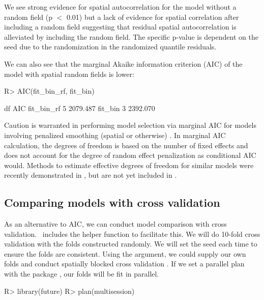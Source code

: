 \documentclass[article]{jss}\usepackage[]{graphicx}\usepackage[dvipsnames]{xcolor}
\newcommand{\fct}[1]{\code{#1()}}
\newcommand{\sdmTMB}{\pkg{sdmTMB}}
\begin{document}
We see strong evidence for spatial autocorrelation for the model without a random field (p $<$ 0.01) but a lack of evidence for spatial correlation after including a random field suggesting that residual spatial autocorrelation is alleviated by including the random field.
The specific p-value is dependent on the seed due to the randomization in the randomized quantile residuals.

We can also see that the marginal Akaike information criterion (AIC) \citep{akaike1974} of the model with spatial random fields is lower:

\begin{Schunk}
\begin{Sinput}
R> AIC(fit_bin_rf, fit_bin)
\end{Sinput}
\begin{Soutput}
           df      AIC
fit_bin_rf  5 2079.487
fit_bin     3 2392.070
\end{Soutput}
\end{Schunk}

Caution is warranted in performing model selection via marginal AIC for models involving penalized smoothing (spatial or otherwise) \citep[e.g.][]{greven2010, safken2021}.
In marginal AIC calculation, the degrees of freedom is based on the number of fixed effects and does not account for the degree of random effect penalization as conditional AIC would.
Methods to estimate effective degrees of freedom for similar models were recently demonstrated in \citet{thorson2024cAIC}, but are not yet included in \sdmTMB.

\subsection{Comparing models with cross validation}

As an alternative to AIC, we can conduct model comparison with cross validation.
\sdmTMB\ includes the helper function \fct{sdmTMB\_cv} to facilitate this.
We will do 10-fold cross validation with the folds constructed randomly.
We will set the seed each time to ensure the folds are consistent.
Using the  argument, we could supply our own folds and conduct spatially blocked cross validation \citep[][]{roberts2017}.
If we set a parallel plan with the  package \citep{bengtsson2021future}, our folds will be fit in parallel.

\begin{Schunk}
\begin{Sinput}
R> library(future)
R> plan(multisession)
\end{Sinput}
\end{Schunk}
\end{document}
